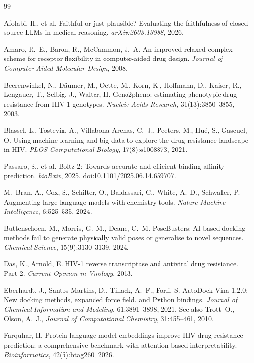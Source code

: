 \documentclass{article}
\begin{document}

\begin{thebibliography}{99}

 Afolabi, H., et al. Faithful or just plausible? Evaluating the faithfulness of closed-source LLMs in medical reasoning. \emph{arXiv:2603.13988}, 2026.

 Amaro, R.~E., Baron, R., McCammon, J.~A. An improved relaxed complex scheme for receptor flexibility in computer-aided drug design. \emph{Journal of Computer-Aided Molecular Design}, 2008.

 Beerenwinkel, N., D\"aumer, M., Oette, M., Korn, K., Hoffmann, D., Kaiser, R., Lengauer, T., Selbig, J., Walter, H. Geno2pheno: estimating phenotypic drug resistance from HIV-1 genotypes. \emph{Nucleic Acids Research}, 31(13):3850--3855, 2003.

 Blassel, L., Tostevin, A., Villabona-Arenas, C.~J., Peeters, M., Hu\'e, S., Gascuel, O. Using machine learning and big data to explore the drug resistance landscape in HIV. \emph{PLOS Computational Biology}, 17(8):e1008873, 2021.

 Passaro, S., et al. Boltz-2: Towards accurate and efficient binding affinity prediction. \emph{bioRxiv}, 2025. doi:10.1101/2025.06.14.659707.

 M.\ Bran, A., Cox, S., Schilter, O., Baldassari, C., White, A.~D., Schwaller, P. Augmenting large language models with chemistry tools. \emph{Nature Machine Intelligence}, 6:525--535, 2024.

 Buttenschoen, M., Morris, G.~M., Deane, C.~M. PoseBusters: AI-based docking methods fail to generate physically valid poses or generalise to novel sequences. \emph{Chemical Science}, 15(9):3130--3139, 2024.

 Das, K., Arnold, E. HIV-1 reverse transcriptase and antiviral drug resistance. Part 2. \emph{Current Opinion in Virology}, 2013.

 Eberhardt, J., Santos-Martins, D., Tillack, A.~F., Forli, S. AutoDock Vina 1.2.0: New docking methods, expanded force field, and Python bindings. \emph{Journal of Chemical Information and Modeling}, 61:3891--3898, 2021. See also Trott, O., Olson, A.~J., \emph{Journal of Computational Chemistry}, 31:455--461, 2010.

 Farquhar, H. Protein language model embeddings improve HIV drug resistance prediction: a comprehensive benchmark with attention-based interpretability. \emph{Bioinformatics}, 42(5):btag260, 2026.


\end{thebibliography}
\end{document}
